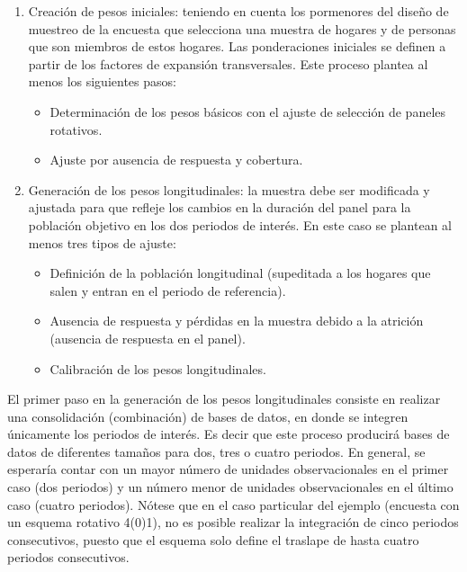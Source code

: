 \documentclass[
  12pt,
]{book}
\providecommand{\tightlist}{%
  \setlength{\itemsep}{0pt}\setlength{\parskip}{0pt}}
\begin{document}
\begin{enumerate}
\def\labelenumi{\arabic{enumi}.}
\tightlist
\item
  Creación de pesos iniciales: teniendo en cuenta los pormenores del diseño de muestreo de la encuesta que selecciona una muestra de hogares y de personas que son miembros de estos hogares. Las ponderaciones iniciales se definen a partir de los factores de expansión transversales. Este proceso plantea al menos los siguientes pasos:

  \begin{itemize}
  \tightlist
  \item
    Determinación de los pesos básicos con el ajuste de selección de paneles rotativos.
  \item
    Ajuste por ausencia de respuesta y cobertura.
  \end{itemize}
\item
  Generación de los pesos longitudinales: la muestra debe ser modificada y ajustada para que refleje los cambios en la duración del panel para la población objetivo en los dos periodos de interés. En este caso se plantean al menos tres tipos de ajuste:

  \begin{itemize}
  \tightlist
  \item
    Definición de la población longitudinal (supeditada a los hogares que salen y entran en el periodo de referencia).
  \item
    Ausencia de respuesta y pérdidas en la muestra debido a la atrición (ausencia de respuesta en el panel).
  \item
    Calibración de los pesos longitudinales.
  \end{itemize}
\end{enumerate}

El primer paso en la generación de los pesos longitudinales consiste en realizar una consolidación (combinación) de bases de datos, en donde se integren únicamente los periodos de interés. Es decir que este proceso producirá bases de datos de diferentes tamaños para dos, tres o cuatro periodos. En general, se esperaría contar con un mayor número de unidades observacionales en el primer caso (dos periodos) y un número menor de unidades observacionales en el último caso (cuatro periodos). Nótese que en el caso particular del ejemplo (encuesta con un esquema rotativo 4(0)1), no es posible realizar la integración de cinco periodos consecutivos, puesto que el esquema solo define el traslape de hasta cuatro periodos consecutivos.
\end{document}
